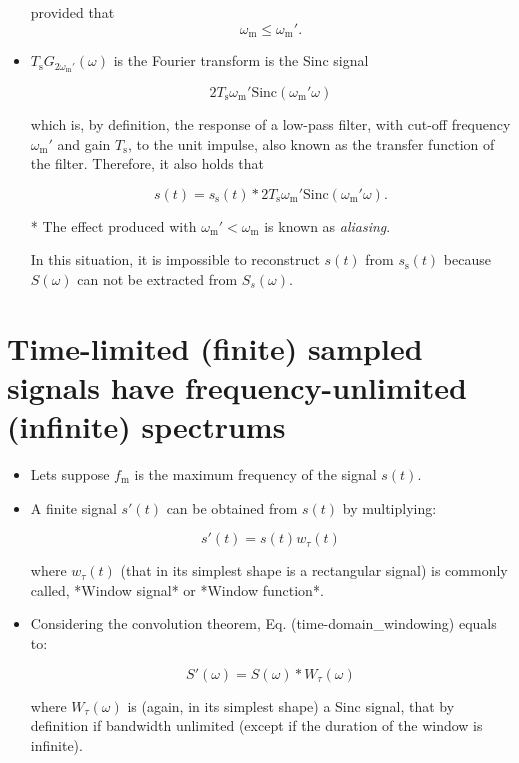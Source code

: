 \begin{itemize}

  provided that $$\omega_\text{m}\leq \omega_\text{m}'.$$

\item $T_\text{s}G_{2\omega_\text{m}'}(\omega)$ is the Fourier transform is the Sinc signal

  \begin{equation}
    2T_\text{s}\omega_\text{m}'\text{Sinc}(\omega_\text{m}'\omega)
  \end{equation}

  which is, by definition, the response of a low-pass filter, with cut-off frequency $\omega_\text{m}'$ and gain $T_\text{s}$, to the unit impulse, also known as the transfer function of the filter. Therefore, it also holds that

  \begin{equation}
    s(t) = s_\text{s}(t)*2T_\text{s}\omega_\text{m}'\text{Sinc}(\omega_\text{m}'\omega).
    \tag{convolution_sampling}
  \end{equation}

  * The effect produced with $\omega_\text{m}' < \omega_\text{m}$ is
  known as \emph{aliasing}.  


  In this situation, it is impossible to reconstruct $s(t)$ from $s_\text{s}(t)$ because $S(\omega)$ can not be extracted from $S_s(\omega)$.

\end{itemize}

\section{Time-limited (finite) sampled signals have frequency-unlimited (infinite) spectrums}
\begin{itemize}
\item Lets suppose $f_\text{m}$ is the maximum frequency of the signal $s(t)$.

\item A finite signal $s'(t)$ can be obtained from $s(t)$ by multiplying:

  \begin{equation}
    s'(t) = s(t)w_\tau(t)
    \tag{time-domain_windowing}
  \end{equation}

  where $w_\tau(t)$ (that in its simplest shape is a rectangular signal) is commonly called, *Window signal* or *Window function*.

\item Considering the convolution theorem, Eq. (time-domain_windowing) equals to:

  \begin{equation}
    S'(\omega) = S(\omega)*W_\tau(\omega)
    \tag{frequency-domain_windowing}
  \end{equation}

  where $W_\tau(\omega)$ is (again, in its simplest shape) a Sinc
  signal, that by definition if bandwidth unlimited (except if the
  duration of the window is infinite).
\end{itemize}


